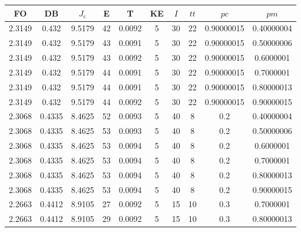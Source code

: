 \begin{table}[h!]
    \footnotesize
    \begin{center}
        \begin{tabular}{|c|c|c|c|c|c|c|c|c|c|}
        \hline
            {\bf FO} & {\bf DB} & $J_e$ & {\bf E} & {\bf T} & {\bf KE} & $I$ & $tt$ & $pc$ & $pm$ \\
        \hline
        \hline
            2.3149 & 0.432  & 9.5179 & 42 & 0.0092 & 5 & 30 & 22 & 0.90000015 & 0.40000004\\
        \hline
        \hline
            2.3149 & 0.432  & 9.5179 & 43 & 0.0091 & 5 & 30 & 22 & 0.90000015 & 0.50000006\\
        \hline
        \hline
            2.3149 & 0.432  & 9.5179 & 43 & 0.0092 & 5 & 30 & 22 & 0.90000015 & 0.6000001\\
        \hline
        \hline
            2.3149 & 0.432  & 9.5179 & 44 & 0.0091 & 5 & 30 & 22 & 0.90000015 & 0.7000001\\
        \hline
        \hline
            2.3149 & 0.432  & 9.5179 & 44 & 0.0091 & 5 & 30 & 22 & 0.90000015 & 0.80000013\\
        \hline
        \hline
            2.3149 & 0.432  & 9.5179 & 44 & 0.0092 & 5 & 30 & 22 & 0.90000015 & 0.90000015\\
        \hline
        \hline
            2.3068 & 0.4335  & 8.4625 & 52 & 0.0093 & 5 & 40 & 8 & 0.2 & 0.40000004\\
        \hline
        \hline
            2.3068 & 0.4335  & 8.4625 & 53 & 0.0093 & 5 & 40 & 8 & 0.2 & 0.50000006\\
        \hline
        \hline
            2.3068 & 0.4335  & 8.4625 & 53 & 0.0094 & 5 & 40 & 8 & 0.2 & 0.6000001\\
        \hline
        \hline
            2.3068 & 0.4335  & 8.4625 & 53 & 0.0094 & 5 & 40 & 8 & 0.2 & 0.7000001\\
        \hline
        \hline
            2.3068 & 0.4335  & 8.4625 & 53 & 0.0094 & 5 & 40 & 8 & 0.2 & 0.80000013\\
        \hline
        \hline
            2.3068 & 0.4335  & 8.4625 & 53 & 0.0094 & 5 & 40 & 8 & 0.2 & 0.90000015\\
        \hline
        \hline
            2.2663 & 0.4412  & 8.9105 & 27 & 0.0092 & 5 & 15 & 10 & 0.3 & 0.7000001\\
        \hline
        \hline
            2.2663 & 0.4412  & 8.9105 & 29 & 0.0092 & 5 & 15 & 10 & 0.3 & 0.80000013\\

\end{tabular}
\end{center}
\end{table}
